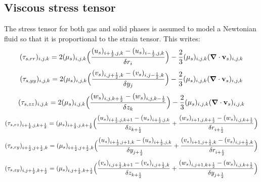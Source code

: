 \subsection{Viscous stress tensor}

The stress tensor for both gas and solid phases is assumed to model a Newtonian 
fluid so that it is proportional to the strain tensor. This writes:\\

\begin{eqnarray}
\htmlimage{}
(\tau_{s,rr})_{i,j,k} = 2 (\mu_s)_{i,j,k} 
\Big( \frac{(u_s)_{i+\frac{1}{2},j,k} - (u_s)_{i-\frac{1}{2},j,k}}
{\delta r_{i}} \Big ) - \frac{2}{3} (\mu_s)_{i,j,k} 
(\mbox{\boldmath $\nabla$} \cdot {\bf v}_s)_{i,j,k}
\nonumber
\end{eqnarray}
%
\begin{eqnarray}
\htmlimage{}
(\tau_{s,yy})_{i,j,k} = 2 (\mu_s)_{i,j,k} 
\Big( \frac{(v_s)_{i,j+\frac{1}{2},k} - (v_s)_{i,j-\frac{1}{2},k}}
{\delta y_{j}} \Big ) - \frac{2}{3} (\mu_s)_{i,j,k} 
(\mbox{\boldmath $\nabla$} \cdot {\bf v}_s)_{i,j,k}
\nonumber
\end{eqnarray}
%
\begin{eqnarray}
\htmlimage{}
(\tau_{s,zz})_{i,j,k} = 2 (\mu_s)_{i,j,k} 
\Big( \frac{(w_s)_{i,j,k+\frac{1}{2}} -(w_s)_{i,j,k-\frac{1}{2}}}
{\delta z_k} \Big ) - \frac{2}{3} (\mu_s)_{i,j,k} 
(\mbox{\boldmath $\nabla$} \cdot {\bf v}_s)_{i,j,k}
\nonumber
\end{eqnarray}
%
\begin{eqnarray}
\htmlimage{}
(\tau_{s,rz})_{i+\frac{1}{2},j,k+\frac{1}{2}} = (\mu_s)_{i+\frac{1}{2},j,k+\frac{1}{2}} 
\Big( \frac{(u_s)_{i+\frac{1}{2},j,k+1} -(u_s)_{i+\frac{1}{2},j,k}}
{\delta z_{k+\frac{1}{2}}} +
\frac{(w_s)_{i+1,j,k+\frac{1}{2}} -(w_s)_{i,j,k+\frac{1}{2}}}
{\delta r_{i+\frac{1}{2}}} \Big )
\nonumber
\end{eqnarray}
%
\begin{eqnarray}
\htmlimage{}
(\tau_{s,ry})_{i+\frac{1}{2},j+\frac{1}{2},k} = (\mu_s)_{i+\frac{1}{2},j+\frac{1}{2},k} 
\Big( \frac{(u_s)_{i+\frac{1}{2},j+1,k} -(u_s)_{i+\frac{1}{2},j,k}}
{\delta y_{j+\frac{1}{2}}} +
\frac{(v_s)_{i+1,j+\frac{1}{2},k} -(v_s)_{i,j+\frac{1}{2},k}}
{\delta r_{i+\frac{1}{2}}} \Big )
\nonumber
\end{eqnarray}
%
\begin{eqnarray}
\htmlimage{}
(\tau_{s,zy})_{i,j+\frac{1}{2},k+\frac{1}{2}} = (\mu_s)_{i,j+\frac{1}{2},k+\frac{1}{2}} 
\Big( \frac{(v_s)_{i,j+\frac{1}{2},k+1} -(v_s)_{i,j+\frac{1}{2},k}}
{\delta z_{k+\frac{1}{2}}} +
\frac{(w_s)_{i,j+1,k+\frac{1}{2}} -(w_s)_{i,j,k+\frac{1}{2}}}
{\delta y_{j+\frac{1}{2}}} \Big )
\nonumber
\end{eqnarray}
